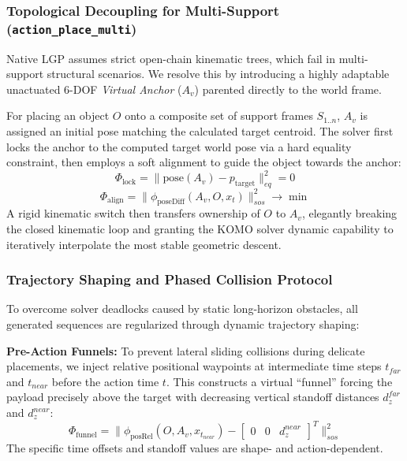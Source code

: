 \documentclass[journal]{IEEEtran}
\begin{document}
  \subsubsection{Topological Decoupling for Multi-Support (\texttt{action\_place\_multi})}
  Native LGP assumes strict open-chain kinematic trees, which fail in multi-support
  structural scenarios. We resolve this by introducing a highly adaptable
  unactuated 6-DOF \textit{Virtual Anchor} ($A_{v}$) parented directly to the world
  frame.

  For placing an object $O$ onto a composite set of support frames $S_{1..n}$,
  $A_{v}$ is assigned an initial pose matching the calculated target centroid.
  The solver first locks the anchor to the computed target world pose via a hard
  equality constraint, then employs a soft alignment to guide the object towards
  the anchor:
  \begin{equation}
    \Phi_{\text{lock}} = \| \text{pose}(A_v) - p_{\text{target}} \|^{2}_{eq} = 0
    \label{eq:anchor_lock}
  \end{equation}
  \begin{equation}
    \Phi_{\text{align}} = \| \phi_{\text{poseDiff}}(A_v, O, x_t) \|^{2}_{sos}
    \to \min
    \label{eq:anchor_align}
  \end{equation}
  A rigid kinematic switch then transfers ownership of $O$ to $A_v$, elegantly
  breaking the closed kinematic loop and granting the KOMO solver dynamic
  capability to iteratively interpolate the most stable geometric descent.

  \subsubsection{Trajectory Shaping and Phased Collision Protocol}

  To overcome solver deadlocks caused by static long-horizon obstacles, all
  generated sequences are regularized through dynamic trajectory shaping:

  \textbf{Pre-Action Funnels:} To prevent lateral sliding collisions during
  delicate placements, we inject relative positional waypoints at intermediate
  time steps $t_{far}$ and $t_{near}$ before the action time $t$. This constructs
  a virtual ``funnel'' forcing the payload precisely above the target with
  decreasing vertical standoff distances $d_z^{far}$ and $d_z^{near}$:
  \begin{equation}
    \Phi_{\text{funnel}} = \| \phi_{\text{posRel}}(O, A_v, x_{t_{near}}) -
    \begin{bmatrix} 0 & 0 & d_z^{near} \end{bmatrix}^{T} \|^{2}_{sos}
    \label{eq:funnel}
  \end{equation}
  The specific time offsets and standoff values are shape- and action-dependent.
\end{document}
